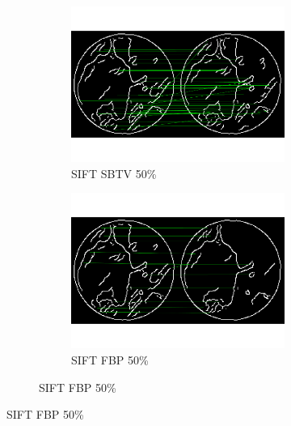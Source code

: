 \documentclass[10pt,a4paper,titlepage]{article}
\begin{document}
\begin{figure}
\begin{figure}[H]
			\begin{subfigure}[b]{0.475\textwidth}
				\includegraphics[width=\textwidth]{Sample1/SIFT/Edges/SB/50p.png}
				\caption{SIFT SBTV 50\%}
			\end{subfigure}
			\begin{subfigure}[b]{0.475\textwidth}
				\includegraphics[width=\textwidth]{Sample1/SIFT/Edges/FBP/50p.png}
				\caption{SIFT FBP 50\%}
			\end{subfigure}
			

\end{figure}
\end{figure}
\end{document}
